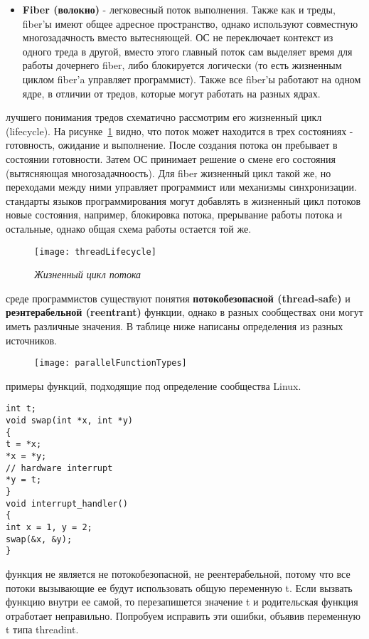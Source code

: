 {\begin{itemize}
			\item\textbf{Fiber (волокно)} - легковесный поток выполнения. Также как и треды, fiber'ы имеют общее адресное пространство, однако используют совместную многозадачность вместо вытесняющей. ОС не переключает контекст из одного треда в другой, вместо этого главный поток сам выделяет время для работы дочернего fiber, либо блокируется логически (то есть жизненным циклом fiber'a управляет программист). Также все fiber'ы работают на одном ядре, в отличии от тредов, которые могут работать на разных ядрах.
		\end{itemize}
	 лучшего понимания тредов схематично рассмотрим его жизненный цикл (lifecycle). На рисунке~\ref{threadLifecycle:image} видно, что поток может находится в трех состояниях - готовность, ожидание и выполнение. После создания потока он пребывает в состоянии готовности. Затем ОС принимает решение о смене его состояния (вытясняющая многозадачноость). Для fiber жизненный цикл такой же, но переходами между ними управляет программист или механизмы синхронизации.
	 стандарты языков программирования могут добавлять в жизненный цикл потоков новые состояния, например, блокировка потока, прерывание работы потока и остальные, однако общая схема работы остается той же.
		\begin{figure}[H]
			\texttt{[image: threadLifecycle]}
			\caption{\textit{Жизненный цикл потока}}
			\label{threadLifecycle:image}
		\end{figure}
	 среде программистов существуют понятия \textbf{потокобезопасной (thread-safe)} и \textbf{реэнтерабельной (reentrant)} функции, однако в разных сообществах они могут иметь различные значения. В таблице ниже написаны определения из разных источников.
		\begin{figure}[H]
			\texttt{[image: parallelFunctionTypes]}
		\end{figure}
	 примеры функций, подходящие под определение сообщества Linux.
	\begin{verbatim}int t;
void swap(int *x, int *y)
{
t = *x;
*x = *y;
// hardware interrupt
*y = t;
}
void interrupt_handler()
{
int x = 1, y = 2;
swap(&x, &y);
}\end{verbatim}
	 функция не является не потокобезопасной, не реентерабельной, потому что все потоки вызывающие ее будут использовать общую переменную t. Если вызвать функцию внутри ее самой, то перезапишется значение t и родительская функция отработает неправильно. Попробуем исправить эти ошибки, объявив переменную t типа \textunderscore \textunderscore threadint.
}
